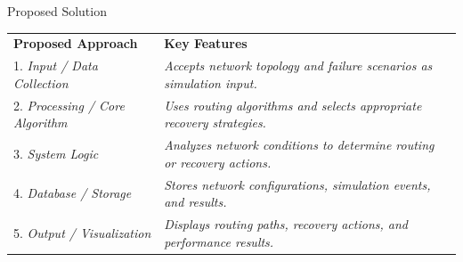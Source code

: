 \documentclass[aspectratio=169,11pt]{beamer}
\newcommand{\placeholder}[1]{\textit{\color{GEUGrey}#1}}
\begin{document}
\begin{frame}{Proposed Solution}

\small

\begin{tabular}{p{} p{}}

\textbf{\color{GEUBlue}Proposed Approach} &
\textbf{\color{GEUBlue}Key Features} \\[3mm]

1. \placeholder{Input / Data Collection} &
\placeholder{Accepts network topology and failure scenarios as simulation input.} \\[3mm]

2. \placeholder{Processing / Core Algorithm} &
\placeholder{Uses routing algorithms and selects appropriate recovery strategies.} \\[3mm]

3. \placeholder{System Logic} &
\placeholder{Analyzes network conditions to determine routing or recovery actions.} \\[3mm]

4. \placeholder{Database / Storage} &
\placeholder{Stores network configurations, simulation events, and results.} \\[3mm]

5. \placeholder{Output / Visualization} &
\placeholder{Displays routing paths, recovery actions, and performance results.}

\end{tabular}

\end{frame}
\end{document}
